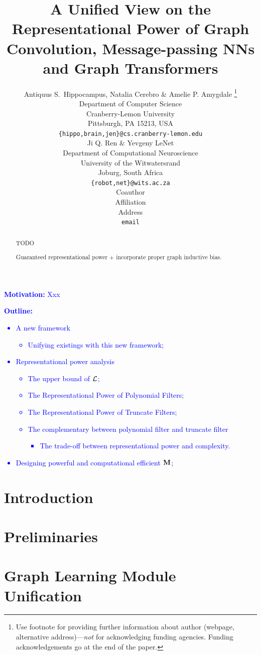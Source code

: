 \documentclass{article} %
\title{A Unified View on the Representational Power of Graph Convolution, Message-passing NNs and Graph Transformers}
\author{Antiquus S.~Hippocampus, Natalia Cerebro \& Amelie P. Amygdale \thanks{ Use footnote for providing further information
		about author (webpage, alternative address)---\emph{not} for acknowledging
		funding agencies.  Funding acknowledgements go at the end of the paper.} \\
	Department of Computer Science\\
	Cranberry-Lemon University\\
	Pittsburgh, PA 15213, USA \\
	\texttt{\{hippo,brain,jen\}@cs.cranberry-lemon.edu} \\
	\And
	Ji Q. Ren \& Yevgeny LeNet \\
	Department of Computational Neuroscience \\
	University of the Witwatersrand \\
	Joburg, South Africa \\
	\texttt{\{robot,net\}@wits.ac.za} \\
	\AND
	Coauthor \\
	Affiliation \\
	Address \\
	\texttt{email}
}
\begin{document}
\maketitle

\begin{abstract}
	TODO
	
	Guaranteed representational power + incorporate proper graph inductive bias.
\end{abstract}

\textcolor{blue}{
	\textbf{Motivation:}
	Xxx
}

\textcolor{blue}{
\textbf{Outline:}
\begin{itemize}
	\item
	A new framework
	\begin{itemize}
		\item
		Unifying existings with this new framework;
	\end{itemize}
	\item
	Representational power analysis
	\begin{itemize}
		\item
		The upper bound of ${\mathcal{L}}$;
		\item
		The Representational Power of Polynomial Filters;
		\item
		The Representational Power of Truncate Filters;
		\item
		The complementary between polynomial filter and truncate filter
		\begin{itemize}
			\item
			The trade-off between representational power and complexity.
		\end{itemize}
	\end{itemize}
	\item
	Designing powerful and computational efficient ${\mathbf{M}}$;
\end{itemize}
}

\section{Introduction}

\section{Preliminaries}

\section{Graph Learning Module Unification}
\end{document}
